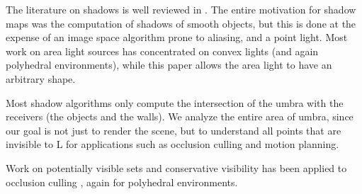 \documentclass[9pt,twocolumn]{article}
\begin{document}
The literature on shadows is well reviewed in \cite{wooReview}.
The entire motivation for shadow maps \cite{williams78}
was the computation of shadows of smooth objects,
but this is done at the expense of an image space algorithm prone to aliasing,
and a point light.
Most work on area light sources has concentrated on convex lights (and again polyhedral
environments), while this paper allows the area light to have an arbitrary shape.

Most shadow algorithms only compute the intersection of the umbra with the receivers 
(the objects and the walls).
We analyze the entire area of umbra, since our goal is not just to render the scene,
but to understand all points
that are invisible to L for applications such as occlusion culling and motion planning.

Work on potentially visible sets and conservative visibility
has been applied to occlusion culling \cite{durand00b,leyvand03,teller91,teller93},
again for polyhedral environments.





\end{document}

